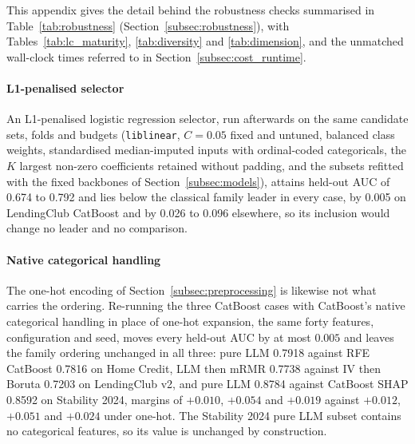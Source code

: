 \documentclass[final,5p,twocolumn]{elsarticle}
\newcommand{\Kfeat}{K}
\providecommand{\DIFaddtex}[1]{{\protect\color{blue} \sf #1}} %
\providecommand{\DIFdelbegin}{} %
\providecommand{\DIFaddFL}[1]{\DIFadd{#1}} %
\providecommand{\DIFaddbeginFL}{} %
\providecommand{\DIFdelendFL}{} %
\providecommand{\DIFadd}[1]{\texorpdfstring{\DIFaddtex{#1}}{#1}} %
\begin{document}
\DIFdelbegin %
\DIFdelendFL \DIFaddbeginFL \DIFaddFL{This appendix gives the detail behind the robustness checks summarised in Table~\ref{tab:robustness} (Section~\ref{subsec:robustness}), with Tables~\ref{tab:lc_maturity}, \ref{tab:diversity} and \ref{tab:dimension}, and the unmatched wall-clock times referred to in Section~\ref{subsec:cost_runtime}.
}

\paragraph{\DIFaddFL{L1-penalised selector}}
\DIFaddFL{An L1-penalised logistic regression selector, run afterwards on the same candidate sets, folds and budgets (\texttt{liblinear}, $C=0.05$ fixed and untuned, balanced class weights, standardised median-imputed inputs with ordinal-coded categoricals, the $\Kfeat$ largest non-zero coefficients retained without padding, and the subsets refitted with the fixed backbones of Section~\ref{subsec:models}), attains held-out AUC of 0.674 to 0.792 and lies below the classical family leader in every case, by 0.005 on LendingClub CatBoost and by 0.026 to 0.096 elsewhere, so its inclusion would change no leader and no comparison.
}

\paragraph{\DIFaddFL{Native categorical handling}}
\DIFaddFL{The one-hot encoding of Section~\ref{subsec:preprocessing} is likewise not what carries the ordering. Re-running the three CatBoost cases with CatBoost's native categorical handling in place of one-hot expansion, the same forty features, configuration and seed, moves every held-out AUC by at most $0.005$ and leaves the family ordering unchanged in all three: pure LLM 0.7918 against RFE CatBoost 0.7816 on Home Credit, LLM then mRMR 0.7738 against IV then Boruta 0.7203 on LendingClub v2, and pure LLM 0.8784 against CatBoost SHAP 0.8592 on Stability 2024, margins of $+0.010$, $+0.054$ and $+0.019$ against $+0.012$, $+0.051$ and $+0.024$ under one-hot. The Stability 2024 pure LLM subset contains no categorical features, so its value is unchanged by construction.
}
\end{document}
